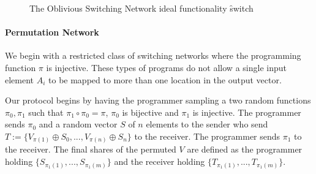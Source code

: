 \begin{figure}[ht]
	\caption{The Oblivious Switching Network ideal functionality \f{switch}}
	\label{fig:perm-ideal}	
\end{figure}


\paragraph{Permutation Network}

We begin with a restricted class of switching networks where the programming function $\pi$ is injective. These types of programs do not allow a single input element $A_i$ to be mapped to more than one location in the output vector. 

Our protocol begins by having the programmer sampling a two random functions $\pi_0,\pi_1$ such that $\pi_1 \circ \pi_0 = \pi$, $\pi_0$ is bijective and $\pi_1$ is injective. The programmer sends $\pi_0$ and a random vector $S$ of $n$ elements to the sender who send $T := \{V_{\pi(1)} \oplus S_0, ...,V_{\pi(n)} \oplus S_n \}$ to the receiver. The programmer sends $\pi_1$ to the receiver. The final shares of the permuted $V$ are defined as the programmer holding $\{S_{\pi_1(1)}, ..., S_{\pi_1(m)}\}$ and the receiver holding $\{T_{\pi_1(1)}, ..., T_{\pi_1(m)}\}$.



